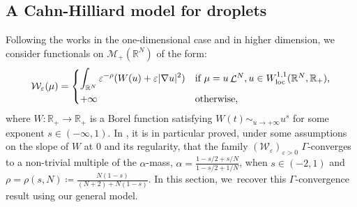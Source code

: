 \documentclass[JEP,XML,SOM,Unicode,published]{cedram}
\theoremstyle{plain}
\theoremstyle{definition}
\newcommand{\R}{\mathbb{R}}
\newcommand{\Mspace}{\mathscr{M}}
\newcommand{\loc}{\mathrm{loc}}
\newcommand{\eps}{\varepsilon}
\DeclarePairedDelimiter{\abs}{\lvert}{\rvert}
\DeclareMathOperator{\lbm}{\mathcal{L}}
\begin{document}
\subsection{A Cahn-Hilliard model for droplets\label{droplets}}
Following the works \cite{bouchitteTransitionsPhasesAvec1996} in the one-dimensional case and \cite{dubsProblemesPerturbationsSingulieres1998} in higher dimension, we consider functionals on $\Mspace_+(\R^N)$ of the form:
\begin{equation}\label{defW}
\mathcal W_\eps(\mu) = \begin{dcases*}
\int_{\R^N} \eps^{-\rho} (W(u) + \eps\abs{\nabla u}^2) & if $\mu = u \lbm^N, u\in W^{1,1}_\loc(\R^N,\R_+)$,\\
+\infty& otherwise,
\end{dcases*}
\end{equation}
where $W : \R_+ \to \R_+$ is a Borel function satisfying $W(t) \sim_{u\to+\infty} u^s$ for some exponent $s\in (-\infty,1)$. In \cite{bouchitteTransitionsPhasesAvec1996, dubsProblemesPerturbationsSingulieres1998}, it is in particular proved, under some assumptions on the slope of $W$ at $0$ and its regularity, that the family $(\mathcal W_\eps)_{\eps > 0}$ $\Gamma$-converges to a non-trivial multiple of the $\alpha$-mass, $\alpha = \frac{1-s/2+s/N}{1-s/2+1/N}$, when $s \in (-2,1)$ and $\rho = \rho(s,N) \coloneqq \frac{N(1-s)}{(N+2)+N(1-s)}$.
In this section, we~recover this $\Gamma$-convergence result using our general model.
\end{document}
